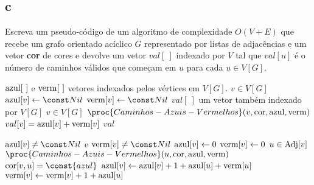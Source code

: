 \subsection{c} Escreva um pseudo-código de um algoritmo de complexidade $O(V +E)$ que recebe um grafo orientado acíclico $G$ representado por listas de adjacências e um vetor \textbf{cor} de cores e devolve um vetor $val[~]$ indexado por $V$ tal que $val[u]$ é o número de caminhos válidos que começam em $u$ para cada $u \in V[G]$.

\itemdsep[0.25]


\newcommand{\Azul}{\const{azul}\xspace}
\newcommand{\Vermelho}{\const{vermelho}\xspace}

\begin{codebox}
\li \Sejam $\mathrm{azul}[~]$ e $\mathrm{verm}[~]$ vetores indexados pelos vértices em $V[G]$.
\li \Para $v \in V[G]$ \Faca        \label{linha:2c:init}
    \Do
\li     $\azul[v] \Recebe \Nulo$
\li     $\verm[v] \Recebe \Nulo$    \label{linha:2c:init:end}
    \End
\li
\li \Seja $val[~]$ um vetor também indexado por $V[G]$
\li \Para $v \in V[G]$ \Faca        \label{linha:2c:preenche}
    \Do
\li     $\proc{Caminhos-Azuis-Vermelhos}(v, \cor, \azul, \verm)$    \label{linha:2c:preenche:chamada}
\li     $val[v] = \mathrm{azul}[v] + \mathrm{verm}[v]$  \label{linha:2c:preenche:end}
    \End
\li \Retorna $val$
\end{codebox}

\begin{codebox}
\li \Se $\azul[v] \ne \Nulo$ e $\verm[v] \ne \Nulo$ \label{linha:2c:memo}
    \Do
\li     \Entao \Retorna
    \End
\li
\li $\mathrm{azul}[v] \leftarrow 0$
\li $\mathrm{verm}[v] \leftarrow 0$
\li \Para $u \in \operatorname{Adj}[v]$ \Faca \label{linha:2c:calc}
    \Do
\li     $\proc{Caminhos-Azuis-Vermelhos}(u, \cor, \azul, \verm)$ \label{linha:2c:calc:chamada}
\li     \Se $\cor[v,u] = \Azul$
        \Do
\li         \Entao $\mathrm{azul}[v] \leftarrow \mathrm{azul}[v] + 1 + \mathrm{azul}[u] + \mathrm{verm}[u]$
\li         \Senao $\mathrm{verm}[v] \leftarrow \mathrm{verm}[v] + 1 + \mathrm{azul}[u]$ \label{linha:2c:calc:end}
        \End
    \End
\end{codebox}
